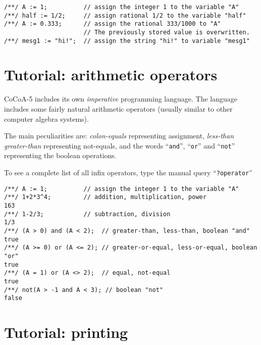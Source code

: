 \documentclass[a4paper]{mybook}
\begin{document}
\begin{Verbatim}[label=example, rulecolor=\color{PineGreen}, frame=single]
/**/ A := 1;          // assign the integer 1 to the variable "A"
/**/ half := 1/2;     // assign rational 1/2 to the variable "half"
/**/ A := 0.333;      // assign the rational 333/1000 to "A"
                      // The previously stored value is overwritten.
/**/ mesg1 := "hi!";  // assign the string "hi!" to variable "mesg1"
\end{Verbatim}



\section{Tutorial: arithmetic operators}
\label{Tutorial: arithmetic operators}

        
CoCoA-5 includes its own \textit{imperative} programming language.  The
language includes some fairly natural arithmetic operators (usually
similar to other computer algebra systems).
\par 
The main peculiarities are: \textit{colon-equals} representing assignment,
\textit{less-than greater-than} representing not-equals, and the words ``\verb&and&'',
``\verb&or&'' and ``\verb&not&'' representing the boolean operations.
\par 
To see a complete list of all infix operators, type the manual query
``\verb&?operator&''

\begin{Verbatim}[label=example, rulecolor=\color{PineGreen}, frame=single]
/**/ A := 1;          // assign the integer 1 to the variable "A"
/**/ 1+2*3^4;         // addition, multiplication, power
163
/**/ 1-2/3;           // subtraction, division
1/3
/**/ (A > 0) and (A < 2);  // greater-than, less-than, boolean "and"
true
/**/ (A >= 0) or (A <= 2); // greater-or-equal, less-or-equal, boolean "or"
true
/**/ (A = 1) or (A <> 2);  // equal, not-equal
true
/**/ not(A > -1 and A < 3); // boolean "not"
false
\end{Verbatim}



\section{Tutorial: printing}
\label{Tutorial: printing}
\end{document}

